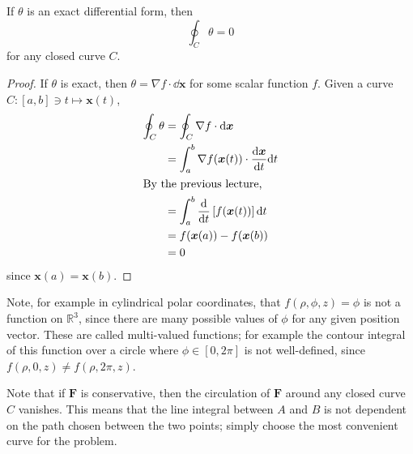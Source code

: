 \documentclass{article}
\begin{document}
\begin{proposition}
    If $\theta$ is an exact differential form, then
    \[ \oint_C \theta = 0 \]
    for any closed curve $C$.
\end{proposition}
\begin{proof}
    If $\theta$ is exact, then $\theta = \nabla f \cdot \dd \bm x$ for some scalar function $f$. Given a curve $C \colon [a, b] \ni t \mapsto \bm x(t)$,
    \begin{align*}
        \oint_C \theta & = \oint_C \nabla f \cdot \dd \bm x                                \\
                       & = \int_a^b \nabla f(\bm x(t)) \cdot \frac{\dd \bm x}{\dd t} \dd t \\
        \intertext{By the previous lecture,}
                       & = \int_a^b \frac{\dd}{\dd t} \left[ f(\bm x(t)) \right] \dd t     \\
                       & = f(\bm x(a)) - f(\bm x(b))                                       \\
                       & = 0
    \end{align*}
    since $\bm x(a) = \bm x(b)$.
\end{proof}
\noindent Note, for example in cylindrical polar coordinates, that $f(\rho, \phi, z) = \phi$ is not a function on $\mathbb R^3$, since there are many possible values of $\phi$ for any given position vector. These are called multi-valued functions; for example the contour integral of this function over a circle where $\phi \in [0, 2\pi]$ is not well-defined, since $f(\rho, 0, z) \neq f(\rho, 2 \pi, z)$.

Note that if $\bm F$ is conservative, then the circulation of $\bm F$ around any closed curve $C$ vanishes. This means that the line integral between $A$ and $B$ is not dependent on the path chosen between the two points; simply choose the most convenient curve for the problem.
\end{document}
